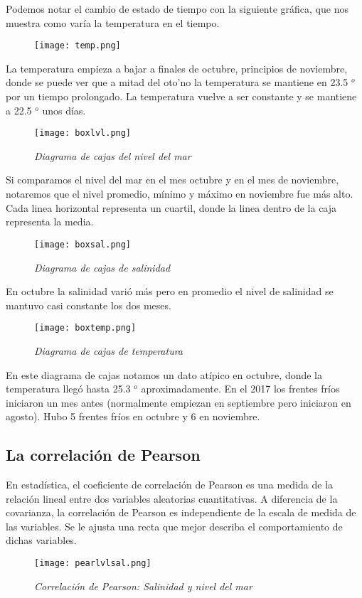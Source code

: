 \documentclass[12pt]{article}
\begin{document}
Podemos notar el cambio de estado de tiempo con la siguiente gr\'afica, que nos muestra como var\'ia la temperatura en el tiempo.
\begin{figure}[H]
\texttt{[image: temp.png]}
\centering
\end{figure}
La temperatura empieza a bajar a finales de octubre, principios de noviembre, donde se puede ver que a mitad del oto'no la temperatura se mantiene en 23.5 $^o$ por un tiempo prolongado. La temperatura vuelve a ser constante y se mantiene a 22.5 $^o$  unos d\'ias.
\begin{figure}[H]
\texttt{[image: boxlvl.png]}
\centering
\caption{\emph{Diagrama de cajas del nivel del mar}}
\end{figure}
Si comparamos el nivel del mar en el mes octubre y en el mes de noviembre, notaremos que el nivel promedio, m\'inimo y m\'aximo en noviembre fue m\'as alto. Cada linea horizontal representa un cuartil, donde la linea dentro de la caja representa la media.
\begin{figure}[H]
\texttt{[image: boxsal.png]}
\centering
\caption{\emph{Diagrama de cajas de salinidad}}
\end{figure}
En octubre la salinidad vari\'o m\'as pero en promedio el nivel de salinidad se mantuvo casi constante los dos meses. 
\begin{figure}[H]
\texttt{[image: boxtemp.png]}
\centering
\caption{\emph{Diagrama de cajas de temperatura}}
\end{figure}
En este diagrama de cajas notamos un dato at\'ipico en octubre, donde la temperatura lleg\'o hasta 25.3 $^o$ aproximadamente. En el 2017 los frentes fr\'ios iniciaron un mes antes (normalmente empiezan en septiembre pero iniciaron en agosto). Hubo 5 frentes fr\'ios en octubre y 6 en noviembre. 


\subsection*{La correlaci\'on de Pearson}
En estadística, el coeficiente de correlación de Pearson es una medida de la relación lineal entre dos variables aleatorias cuantitativas. A diferencia de la covarianza, la correlación de Pearson es independiente de la escala de medida de las variables. Se le ajusta una recta que mejor describa el comportamiento de dichas variables. 
\begin{figure}[H]
\texttt{[image: pearlvlsal.png]}
\centering
\caption{\emph{Correlaci\'on de Pearson: Salinidad y nivel del mar}}
\end{figure}
\end{document}
